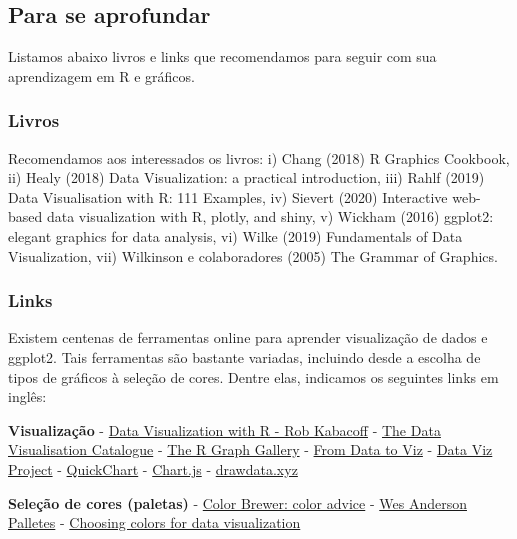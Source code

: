 \documentclass[
]{article}
\begin{document}
\hypertarget{para-se-aprofundar-2}{%
\subsection{Para se aprofundar}\label{para-se-aprofundar-2}}

Listamos abaixo livros e links que recomendamos para seguir com sua aprendizagem em R e gráficos.

\hypertarget{livros-2}{%
\subsubsection{Livros}\label{livros-2}}

Recomendamos aos interessados os livros: i) Chang (2018) R Graphics Cookbook, ii) Healy (2018) Data Visualization: a practical introduction, iii) Rahlf (2019) Data Visualisation with R: 111 Examples, iv) Sievert (2020) Interactive web-based data visualization with R, plotly, and shiny, v) Wickham (2016) ggplot2: elegant graphics for data analysis, vi) Wilke (2019) Fundamentals of Data Visualization, vii) Wilkinson e colaboradores (2005) The Grammar of Graphics.

\hypertarget{links-2}{%
\subsubsection{Links}\label{links-2}}

Existem centenas de ferramentas online para aprender visualização de dados e ggplot2. Tais ferramentas são bastante variadas, incluindo desde a escolha de tipos de gráficos à seleção de cores. Dentre elas, indicamos os seguintes links em inglês:

\textbf{Visualização}
- \href{https://rkabacoff.github.io/datavis/}{Data Visualization with R - Rob Kabacoff}
- \href{https://datavizcatalogue.com/index.html}{The Data Visualisation Catalogue}
- \href{https://www.r-graph-gallery.com/index.html}{The R Graph Gallery}
- \href{https://www.data-to-viz.com/}{From Data to Viz}
- \href{https://datavizproject.com/}{Data Viz Project}
- \href{https://quickchart.io/}{QuickChart}
- \href{https://www.chartjs.org/}{Chart.js}
- \href{https://drawdata.xyz}{drawdata.xyz}

\textbf{Seleção de cores (paletas)}
- \href{https://colorbrewer2.org/}{Color Brewer: color advice}
- \href{https://github.com/karthik/wesanderson}{Wes Anderson Palletes}
- \href{https://blog.datawrapper.de/colors/}{Choosing colors for data visualization}
\end{document}
